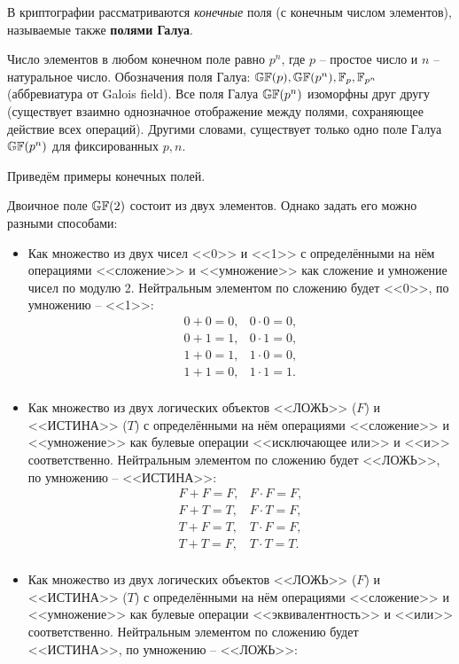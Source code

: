 В криптографии рассматриваются \emph{конечные} поля (с конечным числом элементов), называемые также \textbf{полями Галуа}.

Число элементов в любом конечном поле равно $p^n$, где $p$ -- простое число и $n$ -- натуральное число. Обозначения поля Галуа: $\mathbb{GF}(p), \mathbb{GF}(p^n), \mathbb{F}_p, \mathbb{F}_{p^n}$ (аббревиатура от Galois field). Все поля Галуа $\mathbb{GF}(p^n)$ изоморфны друг другу (существует взаимно однозначное отображение между полями, сохраняющее действие всех операций). Другими словами, существует только одно поле Галуа $\mathbb{GF}(p^n)$ для фиксированных $p, n$.

Приведём примеры конечных полей.

Двоичное поле $\mathbb{GF}(2)$ состоит из двух элементов. Однако задать его можно разными способами:
\begin{itemize}
	\item Как множество из двух чисел <<0>> и <<1>> с определёнными на нём операциями <<сложение>> и <<умножение>> как сложение и умножение чисел по модулю 2. Нейтральным элементом по сложению будет <<0>>, по умножению -- <<1>>:
\[\begin{array}{ll}
	0 + 0 = 0,	& 	0 \cdot 0 = 0, \\
	0 + 1 = 1,	& 	0 \cdot 1 = 0, \\
	1 + 0 = 1,	& 	1 \cdot 0 = 0, \\
	1 + 1 = 0,	& 	1 \cdot 1 = 1. \\
\end{array}\]
	\item Как множество из двух логических объектов <<ЛОЖЬ>> ($F$) и <<ИСТИНА>> ($T$) с определёнными на нём операциями <<сложение>> и <<умножение>> как булевые операции <<исключающее или>> и <<и>> соответственно. Нейтральным элементом по сложению будет <<ЛОЖЬ>>, по умножению -- <<ИСТИНА>>:
\[\begin{array}{ll}
	F + F = F,	& 	F \cdot F = F, \\
	F + T = T,	& 	F \cdot T = F, \\
	T + F = T,	& 	T \cdot F = F, \\
	T + T = F,	& 	T \cdot T = T. \\
\end{array}\]
	\item Как множество из двух логических объектов <<ЛОЖЬ>> ($F$) и <<ИСТИНА>> ($T$) с определёнными на нём операциями <<сложение>> и <<умножение>> как булевые операции <<эквивалентность>> и <<или>> соответственно. Нейтральным элементом по сложению будет <<ИСТИНА>>, по умножению -- <<ЛОЖЬ>>:

\end{itemize}
